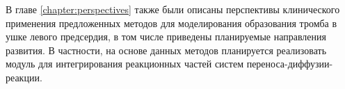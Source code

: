В главе \ref{chapter:perspectives} также были описаны перспективы клинического применения предложенных методов
для моделирования образования тромба в ушке левого предсердия,
в том числе приведены планируемые направления развития.
В частности, на основе данных методов планируется реализовать модуль для интегрирования реакционных частей
систем переноса-диффузии-реакции.
